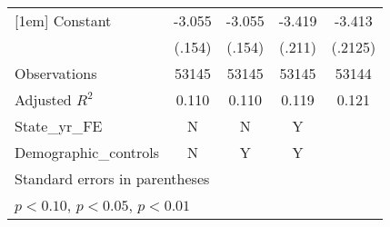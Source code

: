 \begin{table}[htbp]
\begin{tabular}{l*{4}{c}}
[1em]
Constant            &      -3.055\sym{***}&      -3.055\sym{***}&      -3.419\sym{***}&      -3.413\sym{***}\\
                    &      (.154)         &      (.154)         &      (.211)         &     (.2125)         \\
\hline
Observations        &       53145         &       53145         &       53145         &       53144         \\
Adjusted \(R^{2}\)  &       0.110         &       0.110         &       0.119         &       0.121         \\
State\_yr\_FE         &           N         &           N         &           Y         &                     \\
Demographic\_controls&           N         &           Y         &           Y         &                     \\
\hline\hline
\multicolumn{5}{l}{\footnotesize Standard errors in parentheses}\\
\multicolumn{5}{l}{\footnotesize \sym{*} \(p<0.10\), \sym{**} \(p<0.05\), \sym{***} \(p<0.01\)}\\
\end{tabular}
\end{table}
